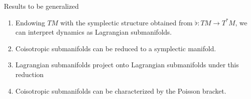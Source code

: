 \begin{frame}{Results to be generalized}
\begin{enumerate}
    \item Endowing $TM$ with the symplectic structure obtained from $\flat: TM \rightarrow T^\ast M$, we can interpret dynamics as Lagrangian submanifolds.
    \pause
    \item Coisotropic submanifolds can be reduced to a symplectic manifold.
    \pause
    \item Lagrangian submanifolds project onto Lagrangian submanifolds under this reduction
    \pause
    \item Coisotropic submanifolds can be characterized by the Poisson bracket.
\end{enumerate}    
\end{frame}
